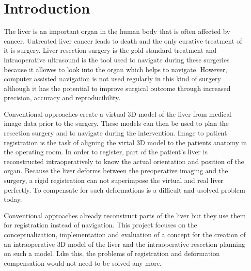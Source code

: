 %
%
%

\chapter{Introduction}
The liver is an important organ in the human body that is often affected by
cancer. Untreated liver
cancer leads to death and the only curative treatment of it is surgery. Liver
resection surgery is the gold standard treatment and intraoperative ultrasound is the
tool used to navigate during these surgeries because it allowes to look into the
organ which helps to navigate. However, computer assisted navigation is not used regularly in
this kind of surgery
although it has the potential to improve
surgical outcome through increased precision, accuracy and reproducibility.

Conventional approaches create a virtual 3D model of the liver from medical
image data prior to the surgery. These models can then be used to plan the
resection surgery and to navigate during the intervention. Image to patient
registration is the task of aligning the virtal 3D model to the patients anatomy
in the operating room. In order to register, part of the patient's liver is
reconstructed intraoperatively to know the actual orientation and position of
the organ. Because the liver deforms between the preoperative imaging
and the surgery, a rigid registration can not superimpose the virtual and real
liver perfectly. To compensate for such deformations is a difficult and usolved
problem today.

Conventional approaches already reconstruct parts of the liver but they use them
for registration instead of navigation. This project focuses on the conceptualization, implementation and evaluation of a concept for the creation of an
intraoperative 3D model of the liver and the intraoperative resection planning
on such a model. Like this, the problems of registration and deformation
compensation would not need to be solved any more.  

